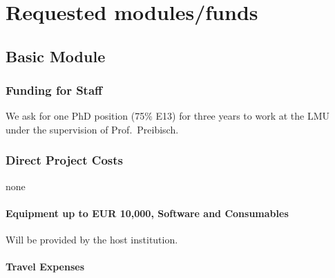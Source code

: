 \documentclass[10pt,fleqn,twoside,a4paper]{article}
\begin{document}
\endgroup




\section{Requested modules/funds}
\renewcommand{\leftmark}{\sc  Requested modules/funds}

\subsection{Basic Module}

\subsubsection{Funding for Staff}

We ask for one PhD position (75\% E13) for three years to work at the
LMU under the supervision of Prof.~Preibisch. 

\subsubsection{Direct Project Costs}

none

\paragraph{Equipment up to EUR 10,000, Software and Consumables}

Will be provided by the host institution.

\paragraph{Travel Expenses}
\end{document}

